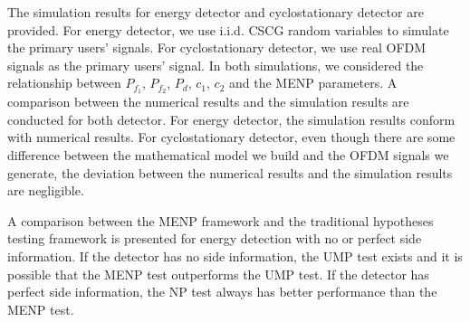 The simulation results for energy detector and cyclostationary detector are provided. 
For energy detector, we use i.i.d. CSCG random variables to simulate the primary users' signals. For cyclostationary detector, we use real OFDM signals as the primary users' signal.  
In both simulations, we considered the relationship between $P_{f_1}$, $P_{f_2}$, $P_d$, $c_1$, $c_2$ and the MENP parameters.  A comparison between the numerical results and the simulation results are conducted for both detector.
For energy detector, the simulation results conform with numerical results. For cyclostationary detector, even though there are some difference between the mathematical model we build and the OFDM signals we generate, the deviation between the numerical results and the simulation results are negligible.  

A comparison between the MENP framework and the traditional hypotheses testing framework is presented for energy detection with no or perfect side information. If the detector has no side information, the UMP test exists and  it is possible that the MENP test outperforms the UMP test. If the detector has perfect side information, the NP test always has better performance than the MENP test.  
